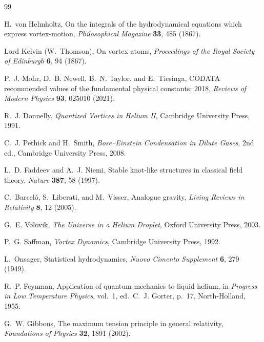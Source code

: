 \documentclass[aps,pra,preprint,longbibliography,nofootinbib]{revtex4-2}
\begin{document}
\begin{thebibliography}{99}

H.~von Helmholtz,
On the integrals of the hydrodynamical equations which express
vortex-motion,
\textit{Philosophical Magazine} \textbf{33}, 485 (1867).

Lord Kelvin (W.~Thomson),
On vortex atoms,
\textit{Proceedings of the Royal Society of Edinburgh} \textbf{6},
94 (1867).

P.~J. Mohr, D.~B. Newell, B.~N. Taylor, and E.~Tiesinga,
CODATA recommended values of the fundamental physical constants: 2018,
\textit{Reviews of Modern Physics} \textbf{93}, 025010 (2021).

R.~J. Donnelly,
\textit{Quantized Vortices in Helium II},
Cambridge University Press, 1991.

C.~J. Pethick and H.~Smith,
\textit{Bose--Einstein Condensation in Dilute Gases}, 2nd ed.,
Cambridge University Press, 2008.

L.~D. Faddeev and A.~J. Niemi,
Stable knot-like structures in classical field theory,
\textit{Nature} \textbf{387}, 58 (1997).

C.~Barcel\'o, S.~Liberati, and M.~Visser,
Analogue gravity,
\textit{Living Reviews in Relativity} \textbf{8}, 12 (2005).

G.~E. Volovik,
\textit{The Universe in a Helium Droplet},
Oxford University Press, 2003.

P.~G. Saffman,
\textit{Vortex Dynamics},
Cambridge University Press, 1992.

L.~Onsager,
Statistical hydrodynamics,
\textit{Nuovo Cimento Supplement} \textbf{6}, 279 (1949).

R.~P. Feynman,
Application of quantum mechanics to liquid helium,
in \textit{Progress in Low Temperature Physics}, vol.~1,
ed.\ C.~J. Gorter, p.~17,
North-Holland, 1955.

G.~W. Gibbons,
The maximum tension principle in general relativity,
\textit{Foundations of Physics} \textbf{32}, 1891 (2002).


\end{thebibliography}
\end{document}
